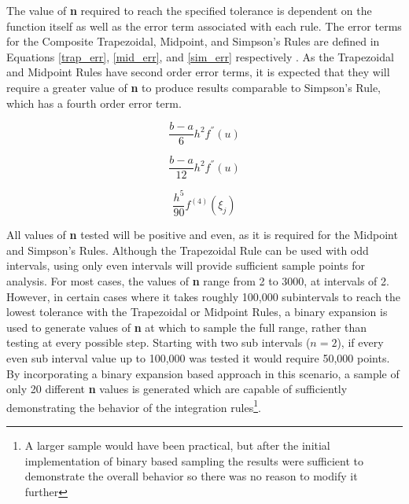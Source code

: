 \documentclass{article}
\begin{document}
The value of \textbf{n} required to reach the specified tolerance is dependent on the function itself as well as the error term associated with each rule. The error terms for the Composite Trapezoidal, Midpoint, and Simpson's Rules are defined in Equations \ref{trap_err}, \ref{mid_err}, and \ref{sim_err} respectively \citep{burden2010}. As the Trapezoidal and Midpoint Rules have second order error terms, it is expected that they will require a greater value of \textbf{n} to produce results comparable to Simpson's Rule, which has a fourth order error term.

 
\begin{center}
    \centering
    \begin{minipage}{0.3\textwidth}
        \centering
        \begin{equation}
		\frac{b-a}{6}h^2f^{''}(u)
		\label{trap_err}
		\end{equation}
    \end{minipage}\hfill
    \begin{minipage}{0.3\textwidth}
        \centering
        \begin{equation}
		\frac{b-a}{12}h^2f^{''}(u)
		\label{mid_err}
		\end{equation}
    \end{minipage}
    \begin{minipage}{0.3\textwidth}
        \centering
        \begin{equation}
		\frac{h^5}{90}f^{(4)}(\xi_j)
		\label{sim_err}
		\end{equation}
    \end{minipage}
\end{center}

\bigskip


All values of \textbf{n} tested will be positive and even, as it is required for the Midpoint and Simpson's Rules. Although the Trapezoidal Rule can be used with odd intervals, using only even intervals will provide sufficient sample points for analysis. For most cases, the values of \textbf{n} range from 2 to 3000, at intervals of 2. However, in certain cases where it takes roughly 100,000 subintervals to reach the lowest tolerance with the Trapezoidal or Midpoint Rules, a binary expansion is used to generate values of \textbf{n} at which to sample the full range, rather than testing at every possible step. Starting with two sub intervals ($n=2$), if every even sub interval value up to 100,000 was tested it would require 50,000 points. By incorporating a binary expansion based approach in this scenario, a sample of only 20 different \textbf{n} values is generated which are capable of sufficiently demonstrating the behavior of the integration rules\footnote{A larger sample would have been practical, but after the initial implementation of binary based sampling the results were sufficient to demonstrate the overall behavior so there was no reason to modify it further}.
\end{document}

